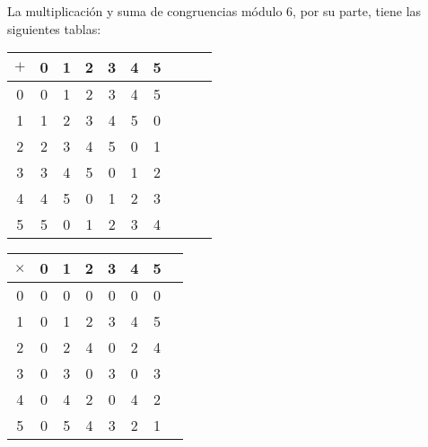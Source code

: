 La multiplicación y suma de congruencias módulo $6$, por su parte, tiene las siguientes tablas:  
  \begin{center}
\begin{tabular}{|c||c|c|c|c|c|c|c|c|c|} 
 \hline
  $\plus$ & 0 & 1 & 2 & 3 & 4 & 5 \\ 
  \hline
  \hline
  0 & 0 & 1 & 2 & 3 & 4 & 5\\ 
  \hline
  1 & 1 & 2 & 3 & 4 & 5 & 0\\ 
  \hline
  2 & 2 & 3 & 4 & 5 & 0 & 1\\ 
  \hline
  3 & 3 & 4 & 5 & 0 & 1 & 2\\ 
  \hline
  4 & 4 & 5 & 0 & 1 & 2 & 3\\ 
  \hline   
  5 & 5 & 0 & 1 & 2 & 3 & 4\\ 
  \hline   
  \end{tabular}
  \hspace{2cm}
  \begin{tabular}{|c||c|c|c|c|c|c|c|} 
 \hline
  $\times$ & 0 & 1 & 2 & 3 & 4 & 5 \\ 
  \hline
  \hline
  0 & 0 & 0 & 0 & 0 & 0 & 0 \\ 
  \hline
  1 & 0 & 1 & 2 & 3 & 4 & 5 \\ 
  \hline
  2 & 0 & 2 & 4 & 0 & 2 & 4 \\ 
  \hline
  3 & 0 & 3 & 0 & 3 & 0 & 3 \\ 
  \hline
  4 & 0 & 4 & 2 & 0 & 4 & 2 \\ 
  \hline  
  5 & 0 & 5 & 4 & 3 & 2 & 1 \\ 
  \hline  
  \end{tabular}
  \end{center}

